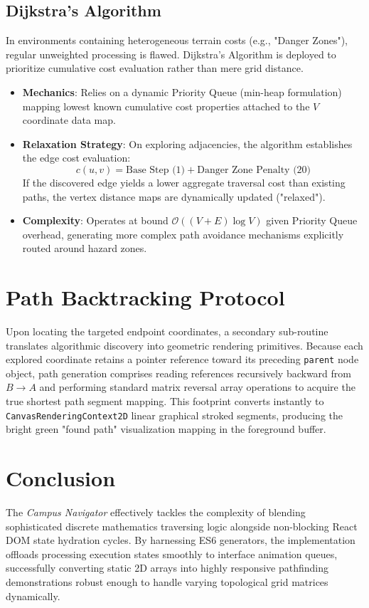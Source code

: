 \documentclass[12pt, a4paper]{article}
\begin{document}
\subsection{Dijkstra's Algorithm}
In environments containing heterogeneous terrain costs (e.g., "Danger Zones"), regular unweighted processing is flawed. Dijkstra's Algorithm is deployed to prioritize cumulative cost evaluation rather than mere grid distance.
\begin{itemize}
    \item \textbf{Mechanics}: Relies on a dynamic Priority Queue (min-heap formulation) mapping lowest known cumulative cost properties attached to the $V$ coordinate data map.
    \item \textbf{Relaxation Strategy}: On exploring adjacencies, the algorithm establishes the edge cost evaluation:
    \begin{equation}
        c(u,v) = \text{Base Step (1)} + \text{Danger Zone Penalty (20)} 
    \end{equation}
    If the discovered edge yields a lower aggregate traversal cost than existing paths, the vertex distance maps are dynamically updated ("relaxed").
    \item \textbf{Complexity}: Operates at bound $\mathcal{O}((V + E) \log V)$ given Priority Queue overhead, generating more complex path avoidance mechanisms explicitly routed around hazard zones. 
\end{itemize}

\section{Path Backtracking Protocol}
Upon locating the targeted endpoint coordinates, a secondary sub-routine translates algorithmic discovery into geometric rendering primitives. Because each explored coordinate retains a pointer reference toward its preceding \texttt{parent} node object, path generation comprises reading references recursively backward from $B \rightarrow A$ and performing standard matrix reversal array operations to acquire the true shortest path segment mapping. This footprint converts instantly to \texttt{CanvasRenderingContext2D} linear graphical stroked segments, producing the bright green "found path" visualization mapping in the foreground buffer. 

\section{Conclusion}
The \textit{Campus Navigator} effectively tackles the complexity of blending sophisticated discrete mathematics traversing logic alongside non-blocking React DOM state hydration cycles. By harnessing ES6 generators, the implementation offloads processing execution states smoothly to interface animation queues, successfully converting static 2D arrays into highly responsive pathfinding demonstrations robust enough to handle varying topological grid matrices dynamically.
\end{document}
